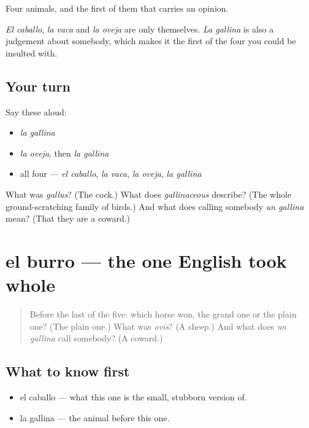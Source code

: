 \begin{grammarlens}[title={What you've built}]
Four animals, and the first of them that carries an opinion.

\emph{El caballo}, \emph{la vaca} and \emph{la oveja} are only themselves. \emph{La gallina} is also a judgement about somebody, which makes it the first of the four you could be insulted with.
\end{grammarlens}

\subsection*{Your turn}
Say these aloud:

\begin{itemize}
\raggedright
  \item \emph{la gallina}
  \item \emph{la oveja}, then \emph{la gallina}
  \item all four — \emph{el caballo}, \emph{la vaca}, \emph{la oveja}, \emph{la gallina}
\end{itemize}

\begin{tcolorbox}[breakable,colback=teal!4,colframe=teal!35!black,title={Before you move on}]
What was \emph{gallus}? (The cock.) What does \emph{gallinaceous} describe? (The whole ground-scratching family of birds.) And what does calling somebody \emph{un gallina} mean? (That they are a coward.)
\end{tcolorbox}
\section[el burro]{el burro — the one English took whole}

\label{lesson:ES-C296-burro}



\begin{quote}
Before the last of the five: which horse won, the grand one or the plain one? (The plain one.) What was \emph{ovis}? (A sheep.) And what does \emph{un gallina} call somebody? (A coward.)
\end{quote}

\subsection*{What to know first}
\begin{itemize}
\raggedright
  \item el caballo — what this one is the small, stubborn version of.
  \item la gallina — the animal before this one.
\end{itemize}

